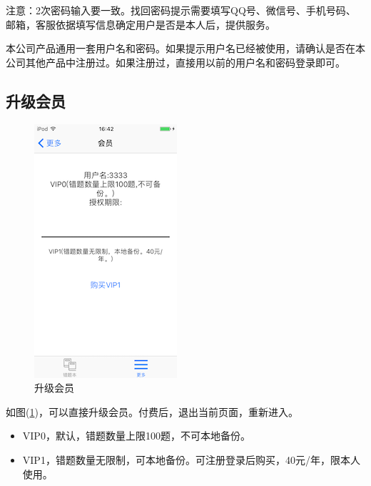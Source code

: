 注意：2次密码输入要一致。找回密码提示需要填写QQ号、微信号、手机号码、邮箱，客服依据填写信息确定用户是否是本人后，提供服务。

本公司产品通用一套用户名和密码。如果提示用户名已经被使用，请确认是否在本公司其他产品中注册过。如果注册过，直接用以前的用户名和密码登录即可。

\subsection{升级会员}
\begin{figure}[H]
	\centering
	\includegraphics{img/29.png}
	\caption{升级会员}
	\label{img29}
\end{figure}
如图(\ref{img29})，可以直接升级会员。付费后，退出当前页面，重新进入。

\begin{itemize}
	\item VIP0，默认，错题数量上限100题，不可本地备份。
	\item VIP1，错题数量无限制，可本地备份。可注册登录后购买，40元/年，限本人使用。
\end{itemize}


